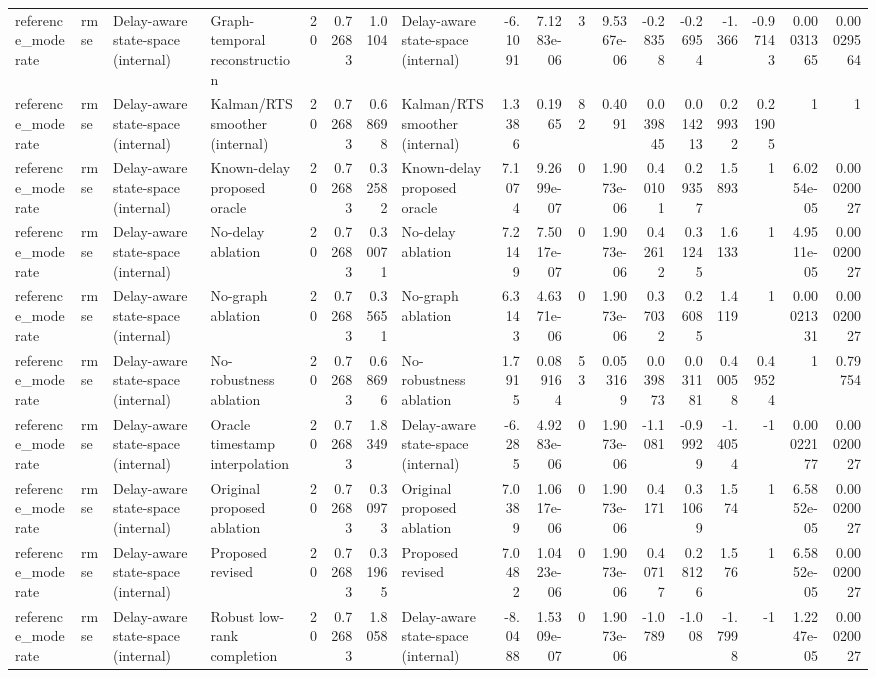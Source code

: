 \begin{table}[!htbp]
{\begin{tabular}{llllrrrlrrrrrrrrrr}
reference_moderate & rmse & Delay-aware state-space (internal) & Graph-temporal reconstruction & 20 & 0.72683 & 1.0104 & Delay-aware state-space (internal) & -6.1091 & 7.1283e-06 & 3 & 9.5367e-06 & -0.28358 & -0.26954 & -1.366 & -0.97143 & 0.00031365 & 0.00029564 \\
reference_moderate & rmse & Delay-aware state-space (internal) & Kalman/RTS smoother (internal) & 20 & 0.72683 & 0.68698 & Kalman/RTS smoother (internal) & 1.3386 & 0.1965 & 82 & 0.4091 & 0.039845 & 0.014213 & 0.29932 & 0.21905 & 1 & 1 \\
reference_moderate & rmse & Delay-aware state-space (internal) & Known-delay proposed oracle & 20 & 0.72683 & 0.32582 & Known-delay proposed oracle & 7.1074 & 9.2699e-07 & 0 & 1.9073e-06 & 0.40101 & 0.29357 & 1.5893 & 1 & 6.0254e-05 & 0.00020027 \\
reference_moderate & rmse & Delay-aware state-space (internal) & No-delay ablation & 20 & 0.72683 & 0.30071 & No-delay ablation & 7.2149 & 7.5017e-07 & 0 & 1.9073e-06 & 0.42612 & 0.31245 & 1.6133 & 1 & 4.9511e-05 & 0.00020027 \\
reference_moderate & rmse & Delay-aware state-space (internal) & No-graph ablation & 20 & 0.72683 & 0.35651 & No-graph ablation & 6.3143 & 4.6371e-06 & 0 & 1.9073e-06 & 0.37032 & 0.26085 & 1.4119 & 1 & 0.00021331 & 0.00020027 \\
reference_moderate & rmse & Delay-aware state-space (internal) & No-robustness ablation & 20 & 0.72683 & 0.68696 & No-robustness ablation & 1.7915 & 0.089164 & 53 & 0.053169 & 0.039873 & 0.031181 & 0.40058 & 0.49524 & 1 & 0.79754 \\
reference_moderate & rmse & Delay-aware state-space (internal) & Oracle timestamp interpolation & 20 & 0.72683 & 1.8349 & Delay-aware state-space (internal) & -6.285 & 4.9283e-06 & 0 & 1.9073e-06 & -1.1081 & -0.99929 & -1.4054 & -1 & 0.00022177 & 0.00020027 \\
reference_moderate & rmse & Delay-aware state-space (internal) & Original proposed ablation & 20 & 0.72683 & 0.30973 & Original proposed ablation & 7.0389 & 1.0617e-06 & 0 & 1.9073e-06 & 0.4171 & 0.31069 & 1.574 & 1 & 6.5852e-05 & 0.00020027 \\
reference_moderate & rmse & Delay-aware state-space (internal) & Proposed revised & 20 & 0.72683 & 0.31965 & Proposed revised & 7.0482 & 1.0423e-06 & 0 & 1.9073e-06 & 0.40717 & 0.28126 & 1.576 & 1 & 6.5852e-05 & 0.00020027 \\
reference_moderate & rmse & Delay-aware state-space (internal) & Robust low-rank completion & 20 & 0.72683 & 1.8058 & Delay-aware state-space (internal) & -8.0488 & 1.5309e-07 & 0 & 1.9073e-06 & -1.0789 & -1.008 & -1.7998 & -1 & 1.2247e-05 & 0.00020027 \\

\end{tabular}}
\end{table}
